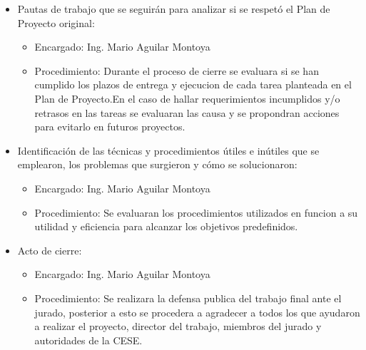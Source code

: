 \documentclass[
11pt, %
codirector, %
]{charter}
\begin{document}
\begin{itemize}
	\item Pautas de trabajo que se seguirán para analizar si se respetó el Plan de Proyecto original:
	\begin{itemize}
		\item Encargado: Ing. Mario Aguilar Montoya
		\item Procedimiento: Durante el proceso de cierre se evaluara si se han cumplido los plazos
		de entrega y ejecucion de cada tarea planteada en el Plan de Proyecto.En el caso de hallar requerimientos incumplidos y/o retrasos en las
		tareas se evaluaran las causa y se propondran acciones para evitarlo en futuros
		proyectos.
	\end{itemize}
	\item Identificación de las técnicas y procedimientos útiles e inútiles que se emplearon, los problemas que surgieron y cómo se solucionaron:
	\begin{itemize}
		\item Encargado: Ing. Mario Aguilar Montoya
		\item Procedimiento: Se evaluaran los procedimientos utilizados en funcion a su utilidad
		y eficiencia para alcanzar los objetivos predefinidos.
	\end{itemize}
	\item Acto de cierre:
	\begin{itemize}
		\item Encargado: Ing. Mario Aguilar Montoya
		\item Procedimiento: Se realizara la defensa publica del trabajo final ante el jurado, posterior a esto se
		procedera a agradecer a todos los que ayudaron a realizar el proyecto, director del
		trabajo, miembros del jurado y autoridades de la CESE.
	\end{itemize}
\end{itemize}
\end{document}
